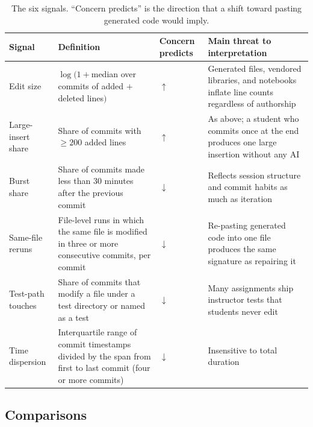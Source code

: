 \documentclass[acmsmall,screen,review,anonymous]{acmart}
\begin{document}
\begin{table}
\caption{The six signals. ``Concern predicts'' is the direction that a shift toward pasting generated code would imply.}
\label{tab:signals}
\footnotesize
\setlength{\tabcolsep}{4pt}
\begin{tabular}{@{}>{\raggedright\arraybackslash}p{1.9cm} >{\raggedright\arraybackslash}p{5.0cm} >{\centering\arraybackslash}p{1.1cm} >{\raggedright\arraybackslash}p{4.9cm}@{}}
\toprule
Signal & Definition & Concern predicts & Main threat to interpretation \\
\midrule
Edit size & $\log(1 + {}$median over commits of added $+$ deleted lines$)$ & $\uparrow$ & Generated files, vendored libraries, and notebooks inflate line counts regardless of authorship \\
Large-insert share & Share of commits with $\geq 200$ added lines & $\uparrow$ & As above; a student who commits once at the end produces one large insertion without any AI \\
Burst share & Share of commits made less than 30 minutes after the previous commit & $\downarrow$ & Reflects session structure and commit habits as much as iteration \\
Same-file reruns & File-level runs in which the same file is modified in three or more consecutive commits, per commit & $\downarrow$ & Re-pasting generated code into one file produces the same signature as repairing it \\
Test-path touches & Share of commits that modify a file under a test directory or named as a test & $\downarrow$ & Many assignments ship instructor tests that students never edit \\
Time dispersion & Interquartile range of commit timestamps divided by the span from first to last commit (four or more commits) & $\downarrow$ & Insensitive to total duration \\
\bottomrule
\end{tabular}
\end{table}

\subsection{Comparisons}
\label{sec:estimands}
\end{document}
